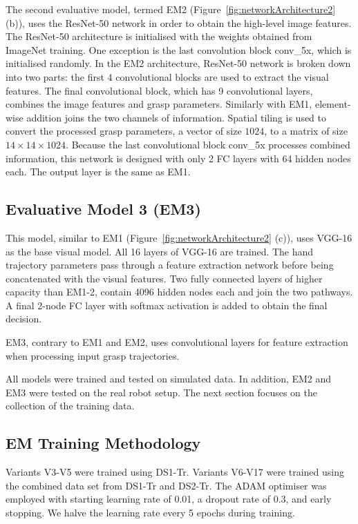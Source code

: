 The second evaluative model, termed EM2 (Figure~\ref{fig:networkArchitecture2} (b)), uses the ResNet-50 network in order to obtain the high-level image features. The ResNet-50 architecture is initialised with the weights obtained from ImageNet training. One exception is the last convolution block conv\_5x, which is initialised randomly. In the EM2 architecture, ResNet-50 network is broken down into two parts: the first 4 convolutional blocks are used to extract the visual features. The final convolutional block, which has 9 convolutional layers, combines the image features and grasp parameters. Similarly with EM1, element-wise addition joins the two channels of information. Spatial tiling is used to convert the processed grasp parameters, a vector of size $1024$, to a matrix of size $14 \times 14 \times 1024$. Because the last convolutional block conv\_5x processes combined information, this network is designed with only 2 FC layers with 64 hidden nodes each. The output layer is the same as EM1. 

\subsection{Evaluative Model 3 (EM3)}

This model, similar to EM1 (Figure~\ref{fig:networkArchitecture2} (c)), uses VGG-16 as the base visual model. All 16 layers of VGG-16 are trained. The hand trajectory parameters pass through a feature extraction network before being concatenated with the visual features. Two fully connected layers of higher capacity than EM1-2, contain 4096 hidden nodes each and join the two pathways. A final 2-node FC layer with softmax activation is added to obtain the final decision.

EM3, contrary to EM1 and EM2, uses convolutional layers for feature extraction when processing input grasp trajectories. 

All models were trained and tested on simulated data. In addition, EM2 and EM3 were tested on the real robot setup. The next section focuses on the collection of the training data.

\subsection{EM Training Methodology}
Variants V3-V5 were trained using DS1-Tr. Variants V6-V17 were trained using the combined data set from DS1-Tr and DS2-Tr. The ADAM optimiser was employed with starting learning rate of 0.01, a dropout rate of 0.3, and early stopping. We halve the learning rate every 5 epochs during training. 